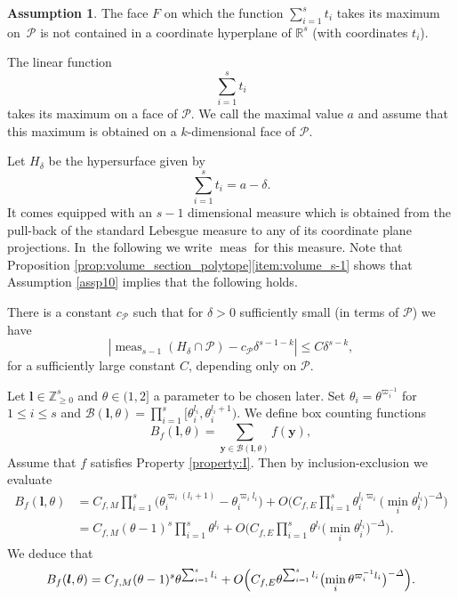 \documentclass[JEP,XML,SOM,Unicode,published]{cedram}
\newcommand{\cB}{\mathcal{B}}
\newcommand{\cBlt}{\cB(\bfl,\theta)}
\let\del\delta
\let\vardel\varDelta
\let\tet\theta
\newcommand{\bfy}{\boldsymbol{y}}
\newcommand{\bfl}{\boldsymbol{l}}
\newcommand{\calP}{\mathcal{P}}
\newcommand{\Z}{\mathbb{Z}}
\newcommand\R{\mathbb{R}}
\DeclareMathOperator{\meas}{meas}
\theoremstyle{definition}
\newtheorem{assumption}[theorem]{Assumption}
\numberwithin{theorem}{section}
\begin{document}
\begin{assumption}\label{assp11}
The face $F$ on which the function $\sum_{i=1}^s t_i$ takes its maximum on~$\calP$ is not contained in a coordinate hyperplane of $\R^s$ (with coordinates $t_i$).
\end{assumption}

The linear function
\[
\sum_{i=1}^s t_i
\]
takes its maximum on a face of $\calP$. We call the maximal value $a$ and assume that this maximum is obtained on a $k$-dimensional face of $\calP$.\par

Let $H_{\del}$ be the hypersurface given by
\[
\sum_{i=1}^s t_i=a-\del.
\]
It comes equipped with an $s-1$ dimensional measure which is obtained from the pull-back of the standard Lebesgue measure to any of its coordinate plane projections. In~the following we write $\meas$ for this measure.
Note that Proposition \ref{prop:volume_section_polytope}\eqref{item:volume_s-1} shows that Assumption \ref{assp10} implies that the following holds.
\par\smallskip
There is a constant $c_{\calP}$ such that for $\del >0$ sufficiently small (in terms of $\calP$) we have
\begin{equation}\label{eqn65}
|\meas_{s-1} (H_{\del} \cap \calP)-c_{\calP}\del^{s-1-k}|\leq C\del^{s-k},
\end{equation}
for a sufficiently large constant $C$, depending only on $\calP$.
\par\smallskip
Let $\bfl\in \Z_{\geq 0}^s$ and $\tet\in(1,2]$ a parameter to be chosen later. Set $\tet_i=\tet^{\varpi_i^{-1}}$ for $1\leq i\leq s$ and $\cBlt=\prod_{i=1}^s[\tet_i^{l_i},\tet_i^{l_i+1})$. We define box counting functions
\[
B_f(\bfl,\tet)= \sum_{\bfy\in\cBlt} f(\bfy),
\]
Assume that $f$ satisfies Property \ref{property:I}. Then by inclusion-exclusion we evaluate
\begin{equation*}
\begin{split}
B_f(\bfl,\tet)&= C_{f,M} \prod_{i=1}^s \bigl(\tet_i^{\varpi_i (l_i+1)} - \tet_i^{\varpi_i l_i}\bigr)+O\biggl(C_{f,E} \prod_{i=1}^s \tet_i^{l_i\varpi_i} \bigl(\min_i \tet_i^{l_i}\bigr)^{-\vardel}\biggr)\\
&= C_{f,M} (\tet-1)^s \prod_{i=1}^s \tet^{l_i}+O\biggl(C_{f,E} \prod_{i=1}^s \tet^{l_i} \bigl(\min_i \tet_i^{l_i}\bigr)^{-\vardel}\biggr).
\end{split}
\end{equation*}
We deduce that
\begin{gather*}
B_f(\bfl,\tet)= C_{f,M} (\tet-1)^s \tet^{\sum_{i=1}^s l_i}+O\Bigl(C_{f,E} \tet^{\sum_{i=1}^s l_i} \bigl(\min_i \tet^{\varpi_i^{-1}l_i}\bigr)^{-\vardel}\Bigr).
\end{gather*}
\end{document}
